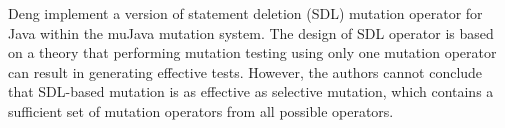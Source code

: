 Deng \etal \cite{deng:icst13} implement a version of statement deletion (SDL) mutation operator for Java within the muJava mutation system. The design of SDL operator is based on a theory that performing mutation testing using only one mutation operator can result in generating effective tests. However, the authors cannot conclude that SDL-based mutation is as effective as selective mutation, which contains a sufficient set of mutation operators from all possible operators. 

%
%
